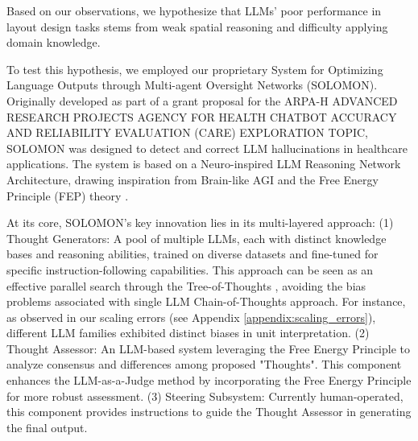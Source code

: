 \documentclass{article}
\begin{document}
Based on our observations, we hypothesize that LLMs' poor performance in layout design tasks stems from weak spatial reasoning and difficulty applying domain knowledge.

To test this hypothesis, we employed our proprietary System for Optimizing Language Outputs through Multi-agent Oversight Networks (SOLOMON). Originally developed as part of a grant proposal for the ARPA-H ADVANCED RESEARCH PROJECTS AGENCY FOR HEALTH CHATBOT ACCURACY AND RELIABILITY EVALUATION (CARE) EXPLORATION TOPIC, SOLOMON was designed to detect and correct LLM hallucinations in healthcare applications. The system is based on a Neuro-inspired LLM Reasoning Network Architecture, drawing inspiration from Brain-like AGI \cite{Byrnes2022} and the Free Energy Principle (FEP) theory \cite{Parr2022}.

At its core, SOLOMON's key innovation lies in its multi-layered approach: 
(1) Thought Generators: A pool of multiple LLMs, each with distinct knowledge bases and reasoning abilities, trained on diverse datasets and fine-tuned for specific instruction-following capabilities. This approach can be seen as an effective parallel search through the Tree-of-Thoughts \cite{yao2023treethoughtsdeliberateproblem, zhang2024cumulativereasoninglargelanguage, Besta_2024, besta2024demystifyingchainstreesgraphs}, avoiding the bias problems associated with single LLM Chain-of-Thoughts approach. For instance, as observed in our scaling errors (see Appendix \ref{appendix:scaling_errors}), different LLM families exhibited distinct biases in unit interpretation.
(2) Thought Assessor: An LLM-based system leveraging the Free Energy Principle to analyze consensus and differences among proposed "Thoughts". This component enhances the LLM-as-a-Judge method \cite{zheng2023judgingllmasajudgemtbenchchatbot, guerreiro2023lookingneedlehaystackcomprehensive, lin2023llmevalunifiedmultidimensionalautomatic, ji2023mitigatinghallucinationlargelanguage} by incorporating the Free Energy Principle for more robust assessment.
(3) Steering Subsystem: Currently human-operated, this component provides instructions to guide the Thought Assessor in generating the final output.
\end{document}
